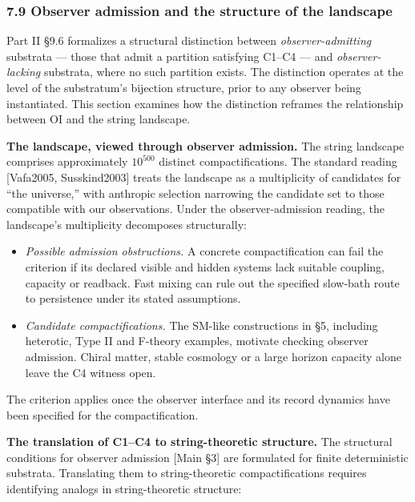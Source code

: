 \documentclass[
]{article}
\begin{document}
\hypertarget{observer-admission-and-the-structure-of-the-landscape}{%
\subsubsection{7.9 Observer admission and the structure of the
landscape}\label{observer-admission-and-the-structure-of-the-landscape}}

Part II §9.6 formalizes a structural distinction between
\emph{observer-admitting} substrata --- those that admit a partition
satisfying C1--C4 --- and \emph{observer-lacking} substrata, where no
such partition exists. The distinction operates at the level of the
substratum's bijection structure, prior to any observer being
instantiated. This section examines how the distinction reframes the
relationship between OI and the string landscape.

\textbf{The landscape, viewed through observer admission.} The string
landscape comprises approximately \(10^{500}\) distinct
compactifications. The standard reading {[}Vafa2005, Susskind2003{]}
treats the landscape as a multiplicity of candidates for ``the
universe,'' with anthropic selection narrowing the candidate set to
those compatible with our observations. Under the observer-admission
reading, the landscape's multiplicity decomposes structurally:

\begin{itemize}
\item
  \emph{Possible admission obstructions.} A concrete compactification
  can fail the criterion if its declared visible and hidden systems lack
  suitable coupling, capacity or readback. Fast mixing can rule out the
  specified slow-bath route to persistence under its stated assumptions.
\item
  \emph{Candidate compactifications.} The SM-like constructions in §5,
  including heterotic, Type II and F-theory examples, motivate checking
  observer admission. Chiral matter, stable cosmology or a large horizon
  capacity alone leave the C4 witness open.
\end{itemize}

The criterion applies once the observer interface and its record
dynamics have been specified for the compactification.

\textbf{The translation of C1--C4 to string-theoretic structure.} The
structural conditions for observer admission {[}Main §3{]} are
formulated for finite deterministic substrata. Translating them to
string-theoretic compactifications requires identifying analogs in
string-theoretic structure:
\end{document}
